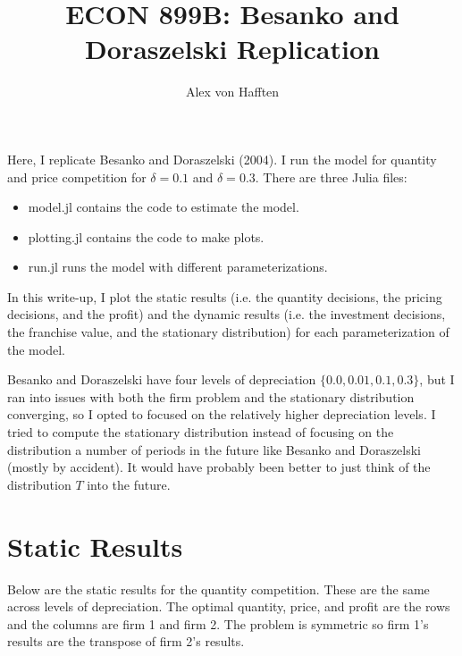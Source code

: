 \documentclass{article}
\title{ECON 899B: Besanko and Doraszelski Replication}
\author{Alex von Hafften}
\begin{document}
\maketitle

Here, I replicate Besanko and Doraszelski (2004).  I run the model for quantity and price competition for $\delta = 0.1$ and $\delta =0.3$. There are three Julia files:

\begin{itemize}

\item model.jl contains the code to estimate the model.

\item plotting.jl contains the code to make plots.

\item run.jl runs the model with different parameterizations.

\end{itemize}

In this write-up, I plot the static results (i.e. the quantity decisions, the pricing decisions, and the profit) and the dynamic results (i.e. the investment decisions, the franchise value, and the stationary distribution) for each parameterization of the model.

\bigskip

Besanko and Doraszelski have four levels of depreciation $\{0.0, 0.01, 0.1, 0.3\}$, but I ran into issues with both the firm problem and the stationary distribution converging, so I opted to focused on the relatively higher depreciation levels.  I tried to compute the stationary distribution instead of focusing on the distribution a number of periods in the future like Besanko and Doraszelski (mostly by accident).  It would have probably been better to just think of the distribution $T$ into the future.

\pagebreak

\section*{Static Results}

Below are the static results for the quantity competition.  These are the same across levels of depreciation.  The optimal quantity, price, and profit are the rows and the columns are firm 1 and firm 2.  The problem is symmetric so firm 1's results are the transpose of firm 2's results.
\end{document}
